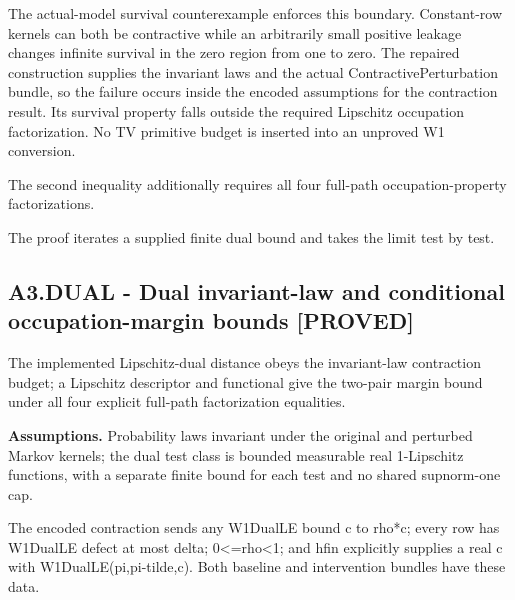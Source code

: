 \documentclass[11pt,a4paper]{article}
\newcommand{\companionEquation}[1]{\begin{center}\sbox{\companionEqBox}{$\displaystyle #1$}\ifdim\wd\companionEqBox>\linewidth\resizebox{\linewidth}{!}{\usebox{\companionEqBox}}\else\usebox{\companionEqBox}\fi\end{center}}
\begin{document}
The actual-model survival counterexample enforces this boundary. Constant-row kernels can both be contractive while an arbitrarily small positive leakage changes infinite survival in the zero region from one to zero. The repaired construction supplies the invariant laws and the actual ContractivePerturbation bundle, so the failure occurs inside the encoded assumptions for the contraction result. Its survival property falls outside the required Lipschitz occupation factorization. No TV primitive budget is inserted into an unproved W1 conversion.

\companionEquation{D(\pi,\widetilde{\pi})\leq\frac{\delta}{1-\rho},\qquad |\widetilde{\kappa}-\kappa|\leq L_FL_h\left(\frac{\delta_0}{1-\rho_0}+\frac{\delta_J}{1-\rho_J}\right).}
{\small The second inequality additionally requires all four full-path occupation-property factorizations.}
\companionEquation{L=\frac{\delta}{1-\rho},\qquad c_n=\rho^n(c-L)+L\longrightarrow L.}
{\small The proof iterates a supplied finite dual bound and takes the limit test by test.}
\subsection*{A3.DUAL - Dual invariant-law and conditional occupation-margin bounds [PROVED]}
The implemented Lipschitz-dual distance obeys the invariant-law contraction budget; a Lipschitz descriptor and functional give the two-pair margin bound under all four explicit full-path factorization equalities.

\textbf{Assumptions.} Probability laws invariant under the original and perturbed Markov kernels; the dual test class is bounded measurable real 1-Lipschitz functions, with a separate finite bound for each test and no shared supnorm-one cap.

The encoded contraction sends any W1DualLE bound c to rho*c; every row has W1DualLE defect at most delta; 0<=rho<1; and hfin explicitly supplies a real c with W1DualLE(pi,pi-tilde,c). Both baseline and intervention bundles have these data.
\end{document}
